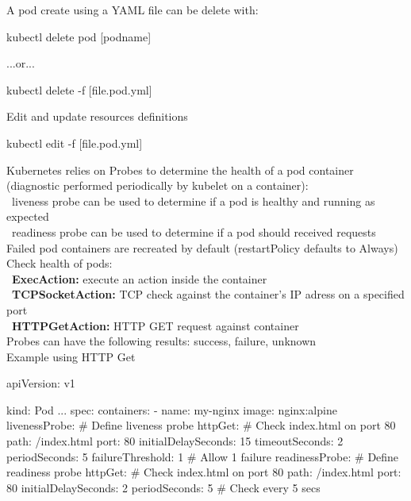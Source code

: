 \documentclass{refcard}
\begin{document}
A pod create using a YAML file can be delete with:
\begin{ttyenv}
kubectl delete pod [podname]
\end{ttyenv}
...or...
\begin{ttyenv}
kubectl delete -f [file.pod.yml] 
\end{ttyenv}

Edit and update resources definitions
\begin{ttyenv}
kubectl edit -f [file.pod.yml] 
\end{ttyenv}

Kubernetes relies on Probes to determine the health of a pod container (diagnostic performed periodically by kubelet on a container):\\
\textbullet\ liveness probe can be used to determine if a pod is healthy and running as expected\\
\textbullet\ readiness probe can be used to determine if a pod should received requests\\

Failed pod containers are recreated by default (restartPolicy defaults to Always)\\

Check health of pods:\\
\textbullet\ \textbf{ExecAction:} execute an action inside the container\\
\textbullet\ \textbf{TCPSocketAction:} TCP check against the container's IP adress on a specified port\\
\textbullet\ \textbf{HTTPGetAction:} HTTP GET request against container\\

Probes can have the following results: success, failure, unknown\\

Example using HTTP Get
\begin{yamlbox}[title={HTTP Get example}]
apiVersion: v1

kind: Pod
...
spec:
  containers:
  - name: my-nginx
    image: nginx:alpine
    livenessProbe: # Define liveness probe
      httpGet: # Check index.html on port 80
        path: /index.html
        port: 80
      initialDelaySeconds: 15
      timeoutSeconds: 2
      periodSeconds: 5
      failureThreshold: 1 # Allow 1 failure
    readinessProbe: # Define readiness probe
      httpGet: # Check index.html on port 80
        path: /index.html
        port: 80
      initialDelaySeconds: 2
      periodSeconds: 5 # Check every 5 secs
\end{yamlbox}
\end{document}
